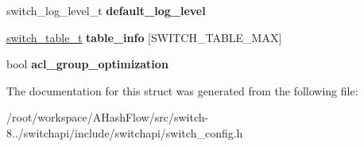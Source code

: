 \begin{DoxyCompactItemize}
\item 
\hypertarget{structswitch__config__s_a0a74f13ff9079b427dbe5e0a3a4e93e6}{switch\+\_\+log\+\_\+level\+\_\+t {\bfseries default\+\_\+log\+\_\+level}}\label{structswitch__config__s_a0a74f13ff9079b427dbe5e0a3a4e93e6}

\item 
\hypertarget{structswitch__config__s_a297ee33b8ad842e165a0ec36df1362e0}{\hyperlink{structswitch__table__s}{switch\+\_\+table\+\_\+t} {\bfseries table\+\_\+info} \mbox{[}S\+W\+I\+T\+C\+H\+\_\+\+T\+A\+B\+L\+E\+\_\+\+M\+A\+X\mbox{]}}\label{structswitch__config__s_a297ee33b8ad842e165a0ec36df1362e0}

\item 
\hypertarget{structswitch__config__s_aaf047d29859aed6f571f1dd704d5a93c}{bool {\bfseries acl\+\_\+group\+\_\+optimization}}\label{structswitch__config__s_aaf047d29859aed6f571f1dd704d5a93c}

\end{DoxyCompactItemize}


The documentation for this struct was generated from the following file\+:\begin{DoxyCompactItemize}
\item 
/root/workspace/\+A\+Hash\+Flow/src/switch-\/8../switchapi/include/switchapi/switch\+\_\+config.\+h\end{DoxyCompactItemize}
